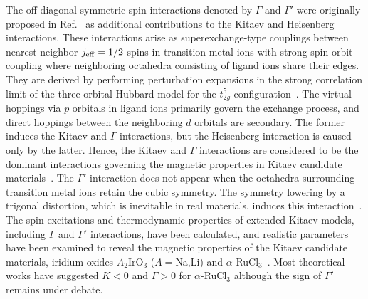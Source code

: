 \documentclass[twocolumn,superscriptaddress,showpacs, longbibliography, aps, prb]{revtex4-2}
\newcommand{\blue}[1]{\textcolor{blue}{#1}}
\newcommand{\orange}[1]{\textcolor{orange}{#1}}
\begin{document}
The off-diagonal symmetric spin interactions %
denoted by $\Gamma$ and $\Gamma'$ were %
originally proposed in Ref.~\cite{Rau2014} as additional contributions to the Kitaev and Heisenberg interactions.
These interactions %
arise as superexchange-type couplings between nearest neighbor $j_{\rm eff}=1/2$ spins in transition metal ions with strong spin-orbit coupling where neighboring octahedra consisting of ligand ions share their edges.
They are derived by performing perturbation expansions in the strong correlation limit of the three-orbital Hubbard model for the $t_{2g}^5$ configuration~\cite{Jackeli_PRL2009}.
The virtual hoppings via $p$ orbitals in ligand ions %
primarily govern the exchange process, and direct hoppings between the neighboring $d$ orbitals are secondary.
The former induces the Kitaev and $\Gamma$ interactions, but the Heisenberg interaction is caused only by the latter. Hence, the Kitaev and $\Gamma$ interactions are %
considered to be the dominant interactions
governing the magnetic properties in Kitaev candidate materials~\cite{Yamaji2014,Winter2016,Winter_2017rev}.
The $\Gamma'$ interaction does not appear %
when the octahedra surrounding transition metal ions retain the cubic symmetry.
The symmetry lowering by a trigonal distortion, which is inevitable in real materials, %
induces this interaction~\cite{Rau2014}.
The spin excitations and thermodynamic properties of extended Kitaev models, including $\Gamma$ and $\Gamma'$ interactions, have been calculated, and realistic parameters have been examined to reveal the magnetic properties of the Kitaev candidate materials, iridium oxides $A_2$IrO$_3$ ($A=$Na,Li) and $\alpha$-RuCl$_3$~\cite{Yamaji2016,Suzuki2018,laurell2020dynamical,Maksimov2020}.
Most theoretical works have suggested $K<0$ and $\Gamma>0$ for $\alpha$-RuCl$_3$ %
although the sign of $\Gamma'$ %
remains under debate.
\end{document}
